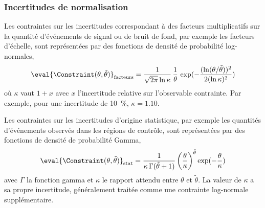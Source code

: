 \subsubsection{Incertitudes de normalisation}
Les contraintes sur les incertitudes correspondant à des facteurs multiplicatifs sur la quantité d'événements de signal ou de bruit de fond, par exemple les facteurs d'échelle, sont représentées par des fonctions de densité de probabilité log-normales,
\begin{equation}
\eval{\Constraint(\theta, \tilde{\theta})}_{\text{facteurs}}
=
\frac{1}{\sqrt{2\pi}\ln\kappa}\,\frac{1}{\theta}\,\exp(-\frac{(\ln(\theta/\tilde{\theta}))^2}{2(\ln\kappa)^2})
\end{equation}
où $\kappa$ vaut $1+x$ avec $x$ l'incertitude relative sur l'observable contrainte.
Par exemple, pour une incertitude de \SI{10}{\%}, $\kappa=\num{1.10}$.
\par
Les contraintes sur les incertitudes d'origine statistique, par exemple les quantités d'événements observés dans les régions de contrôle, sont représentées par des fonctions de densité de probabilité Gamma,
\begin{equation}
\eval{\Constraint(\theta, \tilde{\theta})}_{\text{stat}}
=
\frac{1}{\kappa \, \Gamma(\tilde{\theta}+1)} \left(\frac{\theta}{\kappa}\right)^{\tilde{\theta}} \exp(-\frac{\theta}{\kappa})
\end{equation}
avec
$\Gamma$ la fonction gamma
et
$\kappa$ le rapport attendu entre $\theta$ et $\tilde{\theta}$.
La valeur de $\kappa$ a sa propre incertitude, généralement traitée comme une contrainte log-normale supplémentaire.
